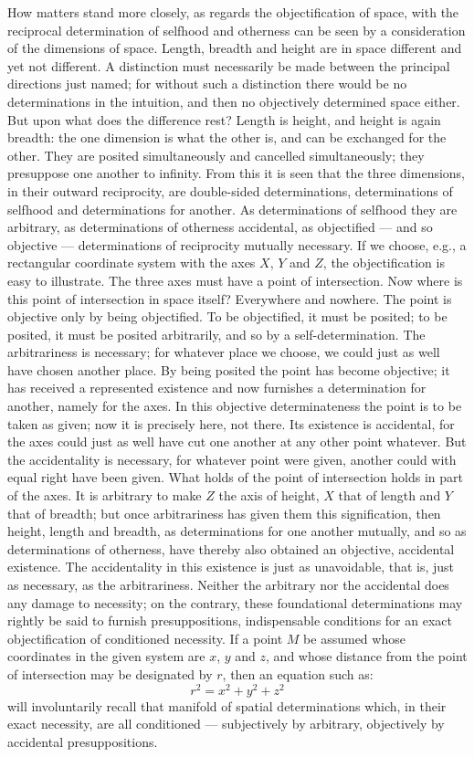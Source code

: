 \documentclass[12pt,a4paper]{book}
\begin{document}
How matters stand more closely, as regards the objectification of space, with
the reciprocal determination of selfhood and otherness can be seen by a
consideration of the dimensions of space. Length, breadth and height are in
space different and yet not different. A distinction must necessarily be made
between the principal directions just named; for without such a distinction
there would be no determinations in the intuition, and then no objectively
determined space either. But upon what does the difference rest? Length is
height, and height is again breadth: the one dimension is what the other is, and
can be exchanged for the other. They are posited simultaneously and cancelled
simultaneously; they presuppose one another to infinity. From this it is seen
that the three dimensions, in their outward reciprocity, are double-sided
determinations, determinations of selfhood and determinations for another. As
determinations of selfhood they are arbitrary, as determinations of otherness
accidental, as objectified --- and so objective --- determinations of reciprocity
mutually necessary. If we choose, e.g., a rectangular coordinate system with the
axes $X$, $Y$ and $Z$, the objectification is easy to illustrate. The three axes
must have a point of intersection. Now where is this point of intersection in
space itself? Everywhere and nowhere. The point is objective only by being
objectified. To be objectified, it must be posited; to be posited, it must be
posited arbitrarily, and so by a self-determination. The arbitrariness is
necessary; for whatever place we choose, we could just as well have chosen
another place. By being posited the point has become objective; it has received
a represented existence and now furnishes a determination for another, namely
for the axes. In this objective determinateness the point is to be taken as
given; now it is precisely here, not there.
Its existence is accidental, for the axes could just as well have cut one
another at any other point whatever. But the accidentality is necessary, for
whatever point were given, another could with equal right have been given. What
holds of the point of intersection holds in part of the axes. It is arbitrary to
make $Z$ the axis of height, $X$ that of length and $Y$ that of breadth; but once
arbitrariness has given them this signification, then height, length and breadth,
as determinations for one another mutually, and so as determinations of
otherness, have thereby also obtained an objective, accidental existence. The
accidentality in this existence is just as unavoidable, that is, just as
necessary, as the arbitrariness. Neither the arbitrary nor the accidental does
any damage to necessity; on the contrary, these foundational determinations may
rightly be said to furnish presuppositions, indispensable conditions for an exact
objectification of conditioned necessity. If a point $M$ be assumed whose
coordinates in the given system are $x$, $y$ and $z$, and whose distance from the
point of intersection may be designated by $r$, then an equation such as:
\[
  r^2 = x^2 + y^2 + z^2
\]
will involuntarily recall that manifold of spatial determinations which, in their
exact necessity, are all conditioned --- subjectively by arbitrary, objectively by
accidental presuppositions.
\end{document}
